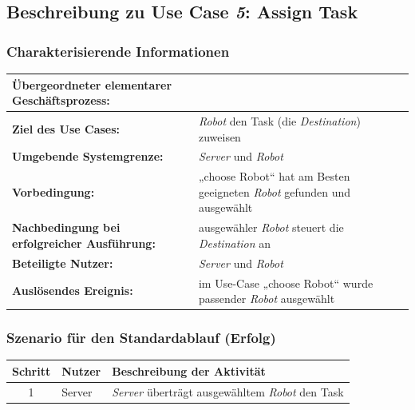 \documentclass[includeheaders]{scrartcl}
\begin{document}

		\subsection{Beschreibung zu Use Case \emph{5}: Assign Task}

			\subsubsection*{Charakterisierende Informationen}

			\begin{table}[H]
				\centering
				\begin{tabularx}{\textwidth}{@{}p{5cm}X@{}}
				\toprule
				\textbf{Übergeordneter elementarer Geschäftsprozess:} & \\ \midrule
				\textbf{Ziel des Use Cases:} & \emph{Robot} den Task (die \emph{Destination}) zuweisen\\ \midrule
				\textbf{Umgebende Systemgrenze:} & \emph{Server} und \emph{Robot} \\ \midrule
				\textbf{Vorbedingung:} & „choose Robot“ hat am Besten geeigneten \emph{Robot} gefunden und ausgewählt\\ \midrule
				\textbf{Nachbedingung bei erfolgreicher Ausführung:} & ausgewähler \emph{Robot} steuert die \emph{Destination} an\\ \midrule
				\textbf{Beteiligte Nutzer:} & \emph{Server} und \emph{Robot}\\ \midrule
				\textbf{Auslösendes Ereignis:} & im Use-Case „choose Robot“ wurde passender \emph{Robot} ausgewählt\\
				\bottomrule
				\end{tabularx}
			\end{table}

			\subsubsection*{Szenario für den Standardablauf (Erfolg)}

			\begin{table}[H]
				\centering
				\begin{tabularx}{\textwidth}{@{}cp{2cm}X@{}}
				\toprule
				Schritt & Nutzer & Beschreibung der Aktivität \\ \midrule
				1 & Server & \emph{Server} überträgt ausgewähltem \emph{Robot} den Task \\
				\bottomrule
				\end{tabularx}
			\end{table}
\end{document}
